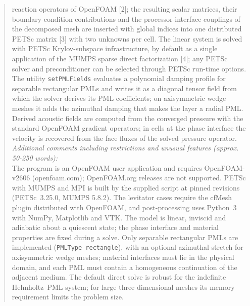 \documentclass[final,12pt,nopreprintline]{elsarticle}
\newcommand{\code}[1]{\texttt{#1}}
\begin{document}
\begin{frontmatter}
\begin{abstract}
\begin{small}
reaction operators of OpenFOAM [2]; the resulting scalar matrices, their
boundary-condition contributions and the processor-interface couplings of the
decomposed mesh are inserted with global indices into one distributed PETSc
matrix [3] with two unknowns per cell.  The linear system is solved with PETSc
Krylov-subspace infrastructure, by default as a single application of the MUMPS
sparse direct factorization [4]; any PETSc solver and preconditioner can be
selected through PETSc run-time options.  The utility \code{setPMLFields}
evaluates a polynomial damping profile for separable rectangular PMLs and
writes it as a diagonal tensor field from which the solver derives its PML
coefficients; on axisymmetric wedge meshes it adds the azimuthal damping that
makes the layer a radial PML.  Derived acoustic fields are computed from the
converged pressure with the standard OpenFOAM gradient operators; in cells at
the phase interface the velocity is recovered from the face fluxes of the
solved pressure operator.\\
{\em Additional comments including restrictions and unusual features (approx.
50-250 words):}\\
The program is an OpenFOAM user application and requires OpenFOAM-v2606
(openfoam.com); OpenFOAM.org releases are not supported.  PETSc with MUMPS and
MPI is built by the supplied script at pinned revisions (PETSc~3.25.0, MUMPS
5.8.2).  The levitator cases require the cfMesh plugin distributed with
OpenFOAM, and post-processing uses Python~3 with NumPy, Matplotlib and VTK.  The
model is linear, inviscid and adiabatic about a quiescent state; the phase
interface and material properties are fixed during a solve.  Only separable
rectangular PMLs are implemented (\code{PMLType rectangle}), with an optional
azimuthal stretch for axisymmetric wedge meshes; material
interfaces must lie in the physical domain, and each PML must contain a
homogeneous continuation of the adjacent medium.  The default direct solve is
robust for the indefinite Helmholtz--PML system; for large three-dimensional
meshes its memory requirement limits the problem size.\\


\end{small}
\end{abstract}
\end{frontmatter}
\end{document}
